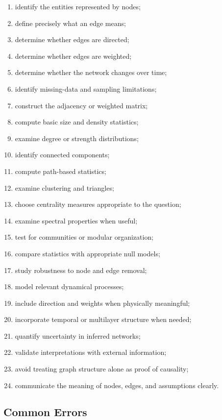 \begin{enumerate}
    \item identify the entities represented by nodes;
    \item define precisely what an edge means;
    \item determine whether edges are directed;
    \item determine whether edges are weighted;
    \item determine whether the network changes over time;
    \item identify missing-data and sampling limitations;
    \item construct the adjacency or weighted matrix;
    \item compute basic size and density statistics;
    \item examine degree or strength distributions;
    \item identify connected components;
    \item compute path-based statistics;
    \item examine clustering and triangles;
    \item choose centrality measures appropriate to the question;
    \item examine spectral properties when useful;
    \item test for communities or modular organization;
    \item compare statistics with appropriate null models;
    \item study robustness to node and edge removal;
    \item model relevant dynamical processes;
    \item include direction and weights when physically meaningful;
    \item incorporate temporal or multilayer structure when needed;
    \item quantify uncertainty in inferred networks;
    \item validate interpretations with external information;
    \item avoid treating graph structure alone as proof of causality;
    \item communicate the meaning of nodes, edges, and assumptions clearly.
\end{enumerate}

\subsection{Common Errors}
\label{subsec:network-science-common-errors}

